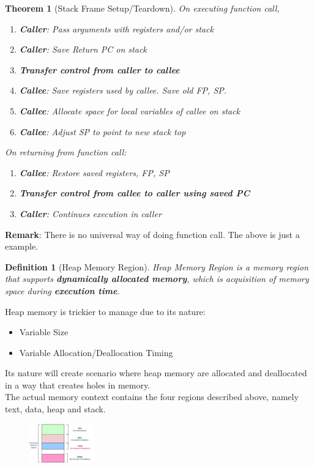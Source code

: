 \documentclass[11pt]{article}
\newtheorem{definition}{Definition}[section]
\newtheorem{theorem}{Theorem}[section]
\theoremstyle{definition}
\begin{document}
\begin{theorem}[Stack Frame Setup/Teardown]
\normalfont On executing function call,
\begin{enumerate}
  \item \textbf{Caller}: Pass arguments with registers and/or stack
  \item \textbf{Caller}: Save Return PC on stack
  \item \textbf{Transfer control from caller to callee}
  \item \textbf{Callee}: Save registers used by callee. Save old FP, SP.
  \item \textbf{Callee}: Allocate space for local variables of callee on stack
  \item \textbf{Callee}: Adjust SP to point to new stack top
\end{enumerate}
On returning from function call:
\begin{enumerate}
  \item \textbf{Callee}: Restore saved registers, FP, SP
  \item \textbf{Transfer control from callee to caller using saved PC}
  \item \textbf{Caller}: Continues execution in caller
\end{enumerate}
\end{theorem}
\textbf{Remark}: There is no universal way of doing function call. The above is just a example.
\begin{definition}[Heap Memory Region]
\normalfont Heap Memory Region is a memory region that supports \textbf{dynamically allocated memory}, which is acquisition of memory space during \textbf{execution time}.
\end{definition}
Heap memory is trickier to manage due to its nature:
\begin{itemize}[itemsep=0pt]
  \item Variable Size
  \item Variable Allocation/Deallocation Timing
\end{itemize}
Its nature will create scenario where heap memory are allocated and deallocated in a way that creates holes in memory.\\

The actual memory context contains the four regions described above, namely text, data, heap and stack.
\begin{figure}[h]
\centering
\includegraphics[width=0.25\textwidth]{2_2.png}
\end{figure}
\end{document}
